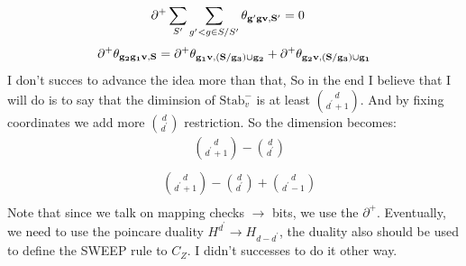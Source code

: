 {\begin{equation*}
\begin{split}
      \partial^{+} \sum_{S^{\prime}}\sum_{g^{\prime} < g \in S/S^{\prime}}\mathbf{\theta_{g^{\prime}gv ,S^{\prime}} } &= 0
    \end{split}
  \end{equation*}
  \begin{equation*}
    \begin{split}
      \partial^{+} \mathbf{\theta_{g_{2}g_{1}v ,S} } = \partial^{+} \mathbf{\theta_{g_{1}v ,(S/ g_{3}) \cup g_{2} } } +  \partial^{+} \mathbf{\theta_{g_{2}v ,(S / g_{3}) \cup g_{1}} } 
    \end{split}
  \end{equation*}
  I don't succes to advance the idea more than that, So in the end I believe that I will do is to say that the diminsion of $\text{Stab}_{v}^{-}$ is at least ${ d \choose d^{\prime}+ 1 } $. And by fixing coordinates we add more ${ d \choose d^{\prime} } $ restriction. So the dimension becomes: 
  \begin{equation*}
    \begin{split}
     & { d \choose d^{\prime}+1 } - { d \choose d^{\prime} } \\
    \end{split}
  \end{equation*}
  \begin{equation*}
    \begin{split}
      & { d \choose d^{\prime}+1 } - { d \choose d^{\prime} } + { d \choose d^{\prime} - 1   } \\
    \end{split}
  \end{equation*}
  Note that since we talk on mapping checks $\rightarrow$ bits, we use the $\partial^{+}$. Eventually, we need to use the poincare duality $H^{d^{\prime}} \rightarrow H_{d - d^{\prime}}$, the duality also should be used to define the SWEEP rule to $C_{Z}$. I didn't successes to do it other way. 
}


